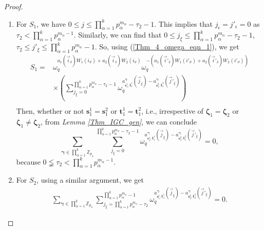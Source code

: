 \documentclass[10pt,a4paper]{amsart}
\theoremstyle{plain}
\begin{document}
\begin{proof}
\begin{mycases}
			\begin{enumerate}
				\item For $S_1$, we have $0 \leq j \leq \prod_{\alpha=1}^{k} p_\alpha^{m_\alpha} -\tau_2-1$. This implies that $j_{\epsilon}=j'_{\epsilon}=0$ as $\tau_2 < \prod_{\alpha=1}^{k} p_\alpha^{m_\alpha-1}$. Similarly, we can find that  $0 \leq j_{\xi} \leq \prod_{\alpha=1}^{k} p_\alpha^{m_\alpha} -\tau_2-1$,  $\tau_2 \leq j'_{\xi} \leq \prod_{\alpha=1}^{k} p_\alpha^{m_\alpha}-1$. So, using (\ref{Thm_4_omega_eqn_1}), we get
				\begin{equation}
					\begin{split}
						S_1= &\omega_q^{a_1(\vec{i}_{\delta}) W_1(i_\vartheta) + a_2(\vec{i}_{\delta}) W_2(i_\vartheta)} \omega_q^{- \left( a_1(\vec{i}'_{\delta}) W_1(i'_\vartheta) + a_2(\vec{i}'_{\delta}) W_2(i'_\vartheta) \right)}\\
						& \times \left( \sum_{j_{\xi}=0}^{\prod_{\alpha=1}^{k} p_\alpha^{m_\alpha} -\tau_2-1} \omega_q^{a_{\mathbf{s}_1^1,\mathbf{t}_1^1}^{\bm{\gamma}} (\vec{j}_{\xi})-a_{\mathbf{s}_1^2,\mathbf{t}_1^2}^{\bm{\gamma}} (\vec{j}'_{\xi}) } \right)\\
					\end{split}
				\end{equation}
				Then, whether or not $\mathbf{s}_1^1= \mathbf{s}_1^2$ or $\mathbf{t}_1^1= \mathbf{t}_1^2$, i.e., irrespective of $\bm{\zeta}_1 = \bm{\zeta}_2$ or $\bm{\zeta}_1 \neq \bm{\zeta}_2$, from \textit{Lemma \ref{Thm_IGC_gen}}, we can conclude
				\begin{equation}\label{eqn_S1}
					\sum_{\bm{\gamma} \in \prod_{\alpha=1}^{k} \mathbb{Z}_{p_\alpha}}^{} \sum_{j_{\xi}=0}^{\prod_{\alpha=1}^{k} p_\alpha^{m_\alpha} -\tau_2-1} \omega_q^{a_{\mathbf{s}_1^1,\mathbf{t}_1^1}^{\bm{\gamma}} (\vec{j}_{\xi})-a_{\mathbf{s}_1^2,\mathbf{t}_1^2}^{\bm{\gamma}} (\vec{j}'_{\xi}) }=0,
				\end{equation}
				because $0 \lneqq \tau_2 <  \prod_{\alpha=1}^{k} p_\alpha^{m_\alpha-1}$.
				
				\item For $S_2$, using a similar argument, we get
				\begin{equation}\label{eqn_S2}
					\begin{split}
						\sum_{\bm{\gamma} \in \prod_{\alpha=1}^{k} \mathbb{Z}_{p_\alpha}}^{} \sum_{j_{\xi}=\prod_{\alpha=1}^{k} p_\alpha^{m_\alpha} -\tau_2}^{\prod_{\alpha=1}^{k}  p_\alpha^{m_\alpha}-1} \omega_q^{a_{\mathbf{s}_1^1,\mathbf{t}_1^1}^{\bm{\gamma}} (\vec{j}_{\xi})-a_{\mathbf{s}_2^2,\mathbf{t}_2^2}^{\bm{\gamma}} (\vec{j}'_{\xi}) }=0.
					\end{split}
				\end{equation}
				

\end{enumerate}
\end{mycases}
\end{proof}
\end{document}
